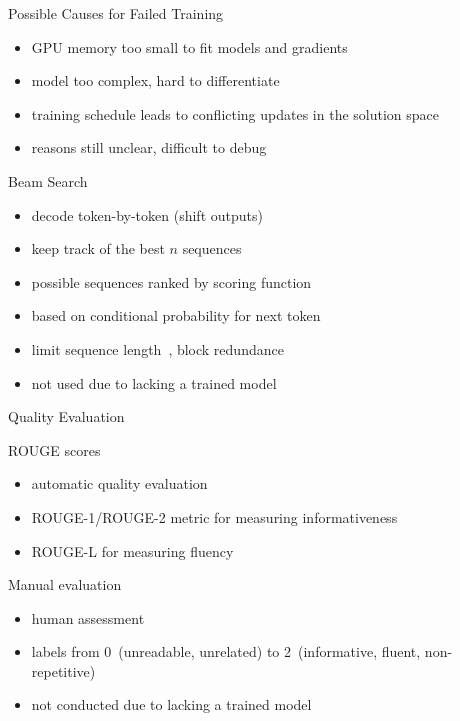\documentclass[english,handout]{mlutalk}
\newcommand{\Rouge}{\mbox{ROUGE}\xspace}
\newcommand{\RougeN}[1]{\mbox{\Rouge-#1}\xspace}
\newcommand{\RougeL}{\mbox{\Rouge-L}\xspace}
\begin{document}
\begin{frame}{Possible Causes for Failed Training}
    \begin{itemize}
        \item GPU memory too small to fit models and gradients
        \item model too complex, hard to differentiate
        \item training schedule leads to conflicting updates in the solution space
        \item reasons still unclear, difficult to debug
    \end{itemize}
\end{frame}

\begin{frame}[fragile]{Beam Search}
    \begin{itemize}
        \item decode token-by-token (shift outputs)
        \item keep track of the best \(n\) sequences
        \item possible sequences ranked by scoring function
        \item based on conditional probability for next token
        \item limit sequence length~\cite{WuSCLNMKCGMKSJL2016}, block redundance~\cite{PaulusXS2018}
        \item not used due to lacking a trained model
    \end{itemize}
\end{frame}

\begin{frame}{Quality Evaluation}
    \begin{block}{\Rouge scores~\cite{Lin2004}}
        \begin{itemize}
            \item automatic quality evaluation
            \item \RougeN{1}/\RougeN{2} metric for measuring informativeness 
            \item \RougeL for measuring fluency
        \end{itemize}
    \end{block}
    \begin{block}{Manual evaluation}
        \begin{itemize}
            \item human assessment
            \item labels from 0~(unreadable, unrelated) to 2~(informative, fluent, non-repetitive)
        \end{itemize}
    \end{block}
    \begin{itemize}
        \item not conducted due to lacking a trained model
    \end{itemize}
\end{frame}
\end{document}

